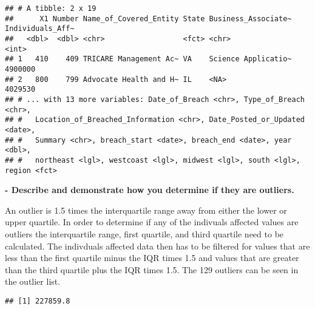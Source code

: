 \documentclass[
]{article}
\newenvironment{Shaded}{\begin{snugshade}}{\end{snugshade}}
\newcommand{\AttributeTok}[1]{\textcolor[rgb]{0.77,0.63,0.00}{#1}}
\newcommand{\ConstantTok}[1]{\textcolor[rgb]{0.00,0.00,0.00}{#1}}
\newcommand{\FunctionTok}[1]{\textcolor[rgb]{0.00,0.00,0.00}{#1}}
\newcommand{\NormalTok}[1]{#1}
\newcommand{\OtherTok}[1]{\textcolor[rgb]{0.56,0.35,0.01}{#1}}
\newcommand{\SpecialCharTok}[1]{\textcolor[rgb]{0.00,0.00,0.00}{#1}}
\begin{document}
\begin{verbatim}
## # A tibble: 2 x 19
##      X1 Number Name_of_Covered_Entity State Business_Associate~ Individuals_Aff~
##   <dbl>  <dbl> <chr>                  <fct> <chr>                          <int>
## 1   410    409 TRICARE Management Ac~ VA    Science Applicatio~          4900000
## 2   800    799 Advocate Health and H~ IL    <NA>                         4029530
## # ... with 13 more variables: Date_of_Breach <chr>, Type_of_Breach <chr>,
## #   Location_of_Breached_Information <chr>, Date_Posted_or_Updated <date>,
## #   Summary <chr>, breach_start <date>, breach_end <date>, year <dbl>,
## #   northeast <lgl>, westcoast <lgl>, midwest <lgl>, south <lgl>, region <fct>
\end{verbatim}

\textbf{- Describe and demonstrate how you determine if they are
outliers.}

An outlier is 1.5 times the interquartile range away from either the
lower or upper quartile. In order to determine if any of the indivuals
affected values are outliers the interquartile range, first quartile,
and third quartile need to be calculated. The indivduals affected data
then has to be filtered for values that are less than the first quartile
minus the IQR times 1.5 and values that are greater than the third
quartile plus the IQR times 1.5. The 129 outliers can be seen in the
outlier list.

\begin{Shaded}
\end{Shaded}

\begin{verbatim}
## [1] 227859.8
\end{verbatim}

\begin{Shaded}
\end{Shaded}
\end{document}

